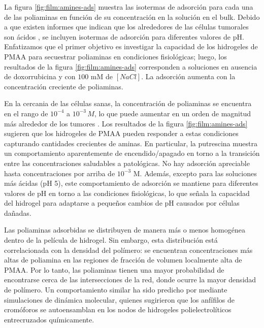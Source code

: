 La figura  \ref{fig:film:amines-ads} muestra las isotermas de adsorci\'on para cada una de las poliaminas en funci\'on de su concentraci\'on en la soluci\'on en el bulk. Debido a que existen informes que indican que los alrededores de las c\'elulas tumorales son \'acidos \cite{vaupel1989blood,tannock1989acid,Raghunand1999, rofstad2006acidic, schmaljohann2006thermo, Koltai2016}, se incluyen isotermas de adsorci\'on para diferentes valores de pH. Enfatizamos que el primer objetivo es investigar la capacidad de los hidrogeles de PMAA para secuestrar poliaminas en condiciones fisiol\'ogicas; luego, los resultados de la figura \ref{fig:film:amines-ads} corresponden a soluciones en ausencia de doxorrubicina y con $100$ mM de $[NaCl]$. La adsorci\'on aumenta con la concentraci\'on creciente de poliaminas. %

En la cercania de las c\'elulas sanas, la concentraci\'on de poliaminas se encuentra en el rango de $10^{-4}$ a $10^{-3}\, M$, lo que puede aumentar en un orden de magnitud m\'as alrededor de los tumores \cite{Soda2011}. Los resultados de la figura \ref{fig:film:amines-ads} sugieren que los hidrogeles de PMAA pueden responder a estas condiciones capturando cantidades crecientes de aminas. En particular, la putrescina muestra un comportamiento aparentemente de encendido/apagado en torno a la transici\'on entre las concentraciones saludables a patol\'ogicas. No hay adsorci\'on apreciable hasta concentraciones por arriba de $10^{-3}$ M. Adem\'as, excepto para las soluciones m\'as \'acidas (pH 5), este comportamiento de adsorci\'on se mantiene para diferentes valores de pH en torno a las condiciones fisiol\'ogicas, lo que se\~nala  la capacidad del hidrogel para adaptarse a peque\~nos cambios de pH causados por c\'elulas da\~nadas.

Las poliaminas adsorbidas se distribuyen de manera m\'as o menos homog\'enea dentro de la pel\'icula de hidrogel. Sin embargo, esta distribuci\'on est\'a correlacionada con la densidad del pol\'imero: se encuentran concentraciones m\'as altas de poliamina en las regiones de fracci\'on de volumen localmente alta de PMAA. Por lo tanto, las poliaminas tienen una mayor probabilidad de encontrarse cerca de las intersecciones de la red, donde ocurre la mayor densidad de pol\'imero. Un comportamiento similar ha sido predicho por  \citet{Sai2020} mediante simulaciones de din\'amica molecular, quienes sugirieron que los anf\'ifilos de crom\'oforos se autoensamblan en los nodos de hidrogeles polielectrol\'iticos entrecruzados qu\'imicamente.


